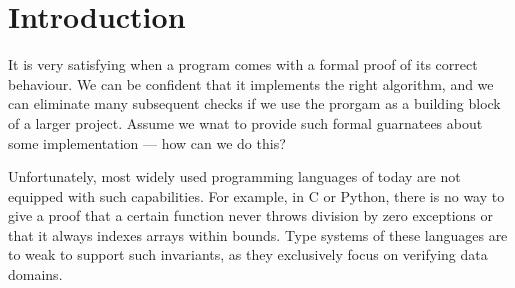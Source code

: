 \documentclass[acmsmall,review,anonymous]{acmart}\settopmatter{printfolios=true,printccs=false,printacmref=false}
\begin{document}


\maketitle

\section{Introduction}

It is very satisfying when a program comes with a formal proof of its
correct behaviour.  We can be confident that it implements the right algorithm,
and we can eliminate many subsequent checks if we use the prorgam as a building
block of a larger project.  Assume we wnat to provide such formal guarnatees
about some implementation --- how can we do this?

Unfortunately, most widely used programming languages of today are not equipped
with such capabilities.  For example, in C or Python, there is no way to give
a proof that a certain function never throws division by zero exceptions or
that it always indexes arrays within bounds.  Type systems of these languages
are to weak to support such invariants, as they exclusively focus on verifying
data domains.

% 
% 
% 
\end{document}
